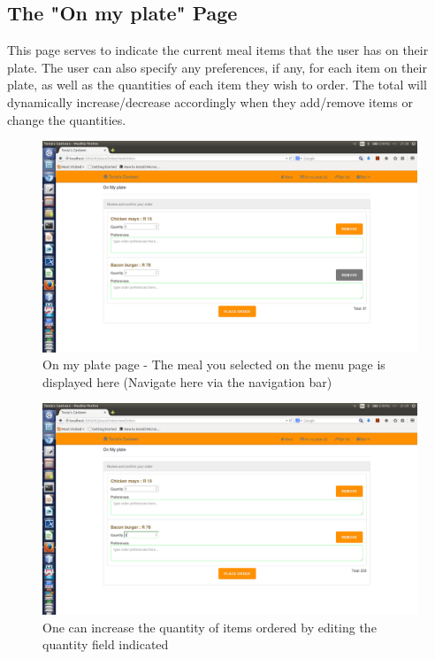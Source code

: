 \documentclass[a4paper,12pt]{report}
\begin{document}
\subsection{The "On my plate" Page} 
This page serves to indicate the current meal items that the user has on their plate. The user can also specify any preferences, if any, for each item on their plate, as well as the quantities of each item they wish to order. The total will dynamically increase/decrease accordingly when they add/remove items or change the quantities.

\begin{figure}[H]
  \centering
    \includegraphics[width=1.0\textwidth]{screenshots/viewOrder1.png}
    \caption{On my plate page - The meal you selected on the menu page is displayed here (Navigate here via the navigation bar)} 
\end{figure}
\begin{figure}[H]
  \centering
    \includegraphics[width=1.0\textwidth]{screenshots/viewOrder2.png}
    \caption{One can increase the quantity of items ordered by editing the quantity field indicated} 
\end{figure}
\end{document}
